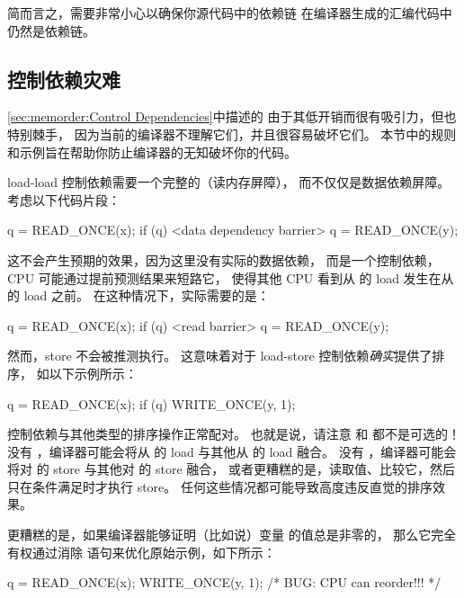 简而言之，需要非常小心以确保你源代码中的依赖链
在编译器生成的汇编代码中仍然是依赖链。

\subsection{控制依赖灾难}
\label{sec:memorder:Control-Dependency Calamities}

\cref{sec:memorder:Control Dependencies}中描述的
由于其低开销而很有吸引力，但也特别棘手，
因为当前的编译器不理解它们，并且很容易破坏它们。
本节中的规则和示例旨在帮助你防止编译器的无知破坏你的代码。

load-load 控制依赖需要一个完整的（读内存屏障），
而不仅仅是数据依赖屏障。
考虑以下代码片段：

\begin{VerbatimN}
q = READ_ONCE(x);
if (q) {
	<data dependency barrier>
	q = READ_ONCE(y);
}
\end{VerbatimN}

这不会产生预期的效果，因为这里没有实际的数据依赖，
而是一个控制依赖，CPU 可能通过提前预测结果来短路它，
使得其他 CPU 看到从  的 load 发生在从  的 load 之前。
在这种情况下，实际需要的是：

\begin{VerbatimN}
q = READ_ONCE(x);
if (q) {
	<read barrier>
	q = READ_ONCE(y);
}
\end{VerbatimN}

然而，store 不会被推测执行。
这意味着对于 load-store 控制依赖\emph{确实}提供了排序，
如以下示例所示：

\begin{VerbatimN}
q = READ_ONCE(x);
if (q)
	WRITE_ONCE(y, 1);
\end{VerbatimN}

控制依赖与其他类型的排序操作正常配对。
也就是说，请注意  和  都不是可选的！
没有 ，编译器可能会将从  的 load 与其他从  的 load 融合。
没有 ，编译器可能会将对  的 store 与其他对  的 store 融合，
或者更糟糕的是，读取值、比较它，然后只在条件满足时才执行 store。
任何这些情况都可能导致高度违反直觉的排序效果。

更糟糕的是，如果编译器能够证明（比如说）变量  的值总是非零的，
那么它完全有权通过消除  语句来优化原始示例，如下所示：

\begin{VerbatimN}
q = READ_ONCE(x);
WRITE_ONCE(y, 1); /* BUG: CPU can reorder!!! */
\end{VerbatimN}

